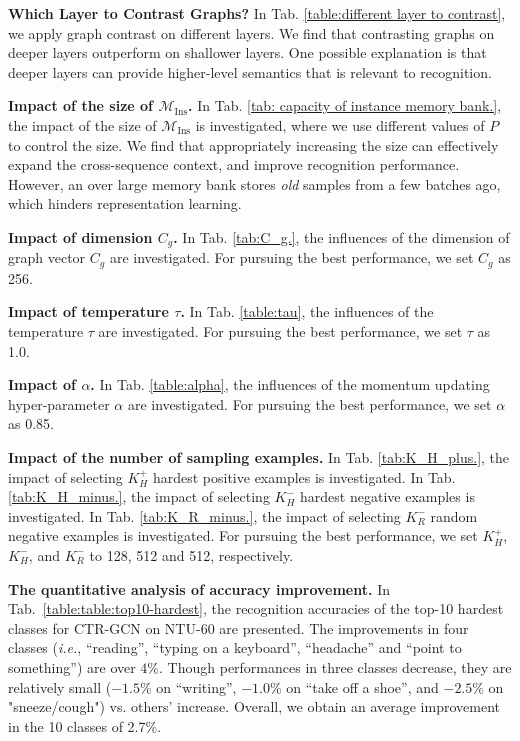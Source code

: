 \documentclass{article} \usepackage{iclr2023_conference,times}
\begin{document}
\noindent \textbf{Which Layer to Contrast Graphs?} In Tab. \ref{table:different layer to contrast}, we apply graph contrast on different layers. We find that contrasting graphs on deeper layers outperform on shallower layers. One possible explanation is that deeper layers can provide higher-level semantics that is relevant to recognition.

\textbf{Impact of the size of $\mathcal{M}_\text{Ins}$.} In Tab. \ref{tab: capacity of instance memory bank.}, the impact of the size of $\mathcal{M}_\text{Ins}$ is investigated, where we use different values of $P$ to control the size. We find that appropriately increasing the size can effectively expand the cross-sequence context, and improve recognition performance. However, an over large memory bank stores \textit{old} samples from a few batches ago, which hinders representation learning.

\noindent \textbf{Impact of dimension $C_g$.} 
In Tab. \ref{tab:C_g.}, the influences of the dimension of graph vector $C_g$ are investigated. For pursuing the best performance, we set $C_g$ as 256.

\noindent \textbf{Impact of temperature $\tau$.} 
In Tab. \ref{table:tau}, the influences of the temperature $\tau$ are investigated. For pursuing the best performance, we set $\tau$ as 1.0.

\noindent \textbf{Impact of $\alpha$.} 
In Tab. \ref{table:alpha}, the influences of the momentum updating hyper-parameter $\alpha$ are investigated. For pursuing the best performance, we set $\alpha$ as 0.85.

\textbf{Impact of the number of sampling examples.}
In Tab. \ref{tab:K_H_plus.}, the impact of selecting $K_H^+$ hardest positive examples is investigated. 
In Tab. \ref{tab:K_H_minus.}, the impact of selecting $K_H^-$ hardest negative examples is investigated. 
In Tab. \ref{tab:K_R_minus.}, the impact of selecting $K_R^-$ random negative examples is investigated. 
For pursuing the best performance, we set $K_H^+$, $K_H^-$, and $K_R^-$ to 128, 512 and 512, respectively.








\textbf{The quantitative analysis of accuracy improvement.}
In Tab.~\ref{table:table:top10-hardest}, the recognition accuracies of the top-10 hardest classes for CTR-GCN on NTU-60 are presented. The improvements in four classes (\emph{i.e.}, ``reading'', ``typing on a keyboard'', ``headache'' and ``point to something'') are over $4\%$. Though performances in three classes decrease, they are relatively small ($-1.5\%$ on ``writing'', $-1.0\%$ on ``take off a shoe'', and $-2.5\%$ on "sneeze/cough") vs. others' increase. Overall, we obtain an average improvement in the 10 classes of 2.7\%.
\end{document}
